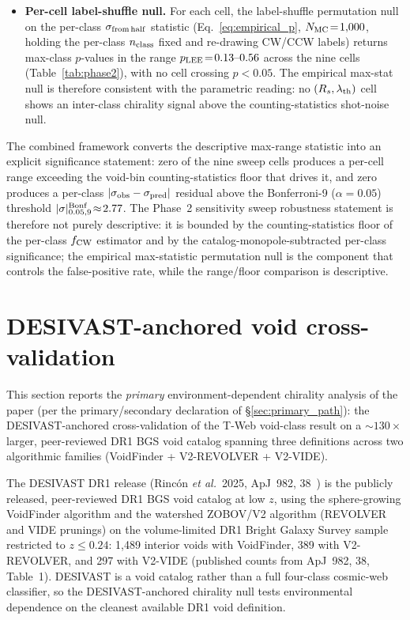 \documentclass[aps,prd,twocolumn,superscriptaddress,showpacs,preprintnumbers,nofootinbib,longbibliography,floatfix]{revtex4-2}
\begin{document}
\begin{itemize}
\item \textbf{Per-cell label-shuffle null.} For each cell, the
label-shuffle permutation null on the per-class $\sigma_{\rm from\,half}$
statistic (Eq.~\eqref{eq:empirical_p}, $N_{\rm MC}\!=\!1{,}000$,
holding the per-class $n_{\rm class}$ fixed and re-drawing CW/CCW
labels) returns max-class $p$-values in the range $p_{\rm LEE}\!=\!
0.13\text{--}0.56$ across the nine cells (Table~\ref{tab:phase2}),
with no cell crossing
$p\!<\!0.05$. The empirical max-stat null is therefore consistent
with the parametric reading: no $(R_s, \lambda_{\rm th})$ cell shows
an inter-class chirality signal above the counting-statistics
shot-noise null.
\end{itemize}

The combined framework converts the descriptive max-range statistic
into an explicit significance statement: zero of the nine sweep
cells produces a per-cell range exceeding the void-bin
counting-statistics floor that drives it, and zero produces a per-class
$|\sigma_{\rm obs}-\sigma_{\rm pred}|$ residual above the Bonferroni-9
($\alpha
= 0.05$) threshold $|\sigma|^{\rm Bonf}_{0.05,9}\!\approx\!2.77$. The
Phase~2 sensitivity sweep robustness statement is therefore not
purely descriptive: it is bounded by the counting-statistics floor
of the per-class $f_{\rm CW}$ estimator and by the
catalog-monopole-subtracted per-class significance; the empirical
max-statistic permutation null is the component that controls the
false-positive rate, while the range/floor comparison is descriptive.

\section{DESIVAST-anchored void cross-validation}\label{sec:desivast_primary}

This section reports the \emph{primary} environment-dependent
chirality analysis of the paper (per the primary/secondary declaration
of \S\ref{sec:primary_path}): the DESIVAST-anchored cross-validation
of the T-Web void-class result on a ${\sim}130\times$ larger,
peer-reviewed DR1 BGS void catalog spanning three definitions across
two algorithmic families (VoidFinder + V2-REVOLVER + V2-VIDE).

The DESIVAST DR1 release (Rinc\'on \textit{et al.}\ 2025, ApJ~982,
38~\cite{DESIVAST2025}) is the publicly released, peer-reviewed
DR1 BGS void catalog at low $z$, using the sphere-growing VoidFinder
algorithm and the watershed ZOBOV/V2 algorithm (REVOLVER and VIDE
prunings) on the volume-limited DR1 Bright Galaxy Survey sample
restricted to $z \leq 0.24$: 1,489 interior voids with VoidFinder,
389 with V2-REVOLVER, and 297 with V2-VIDE (published counts
from ApJ~982, 38, Table~1). DESIVAST is a void
catalog rather than a full four-class cosmic-web classifier, so the
DESIVAST-anchored chirality null tests environmental dependence on
the cleanest available DR1 void definition.
\end{document}
